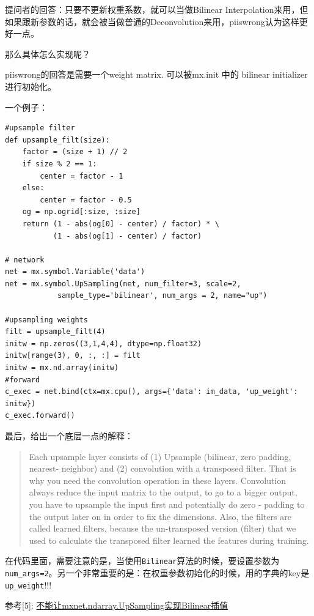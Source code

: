 提问者的回答：只要不更新权重系数，就可以当做Bilinear Interpolation来用，但如果跟新参数的话，就会被当做普通的Deconvolution来用，piiswrong认为这样更好一点。

那么具体怎么实现呢？

piiswrong的回答是需要一个weight matrix. 可以被mx.init 中的 bilinear initializer进行初始化。

一个例子：

\begin{lstlisting}
#upsample filter
def upsample_filt(size):
    factor = (size + 1) // 2
    if size % 2 == 1:
        center = factor - 1
    else:
        center = factor - 0.5
    og = np.ogrid[:size, :size]
    return (1 - abs(og[0] - center) / factor) * \
           (1 - abs(og[1] - center) / factor)

# network
net = mx.symbol.Variable('data')
net = mx.symbol.UpSampling(net, num_filter=3, scale=2, 
			sample_type='bilinear', num_args = 2, name="up")

#upsampling weights
filt = upsample_filt(4)
initw = np.zeros((3,1,4,4), dtype=np.float32)
initw[range(3), 0, :, :] = filt
initw = mx.nd.array(initw)
#forward
c_exec = net.bind(ctx=mx.cpu(), args={'data': im_data, 'up_weight': initw})
c_exec.forward()
\end{lstlisting}

最后，给出一个底层一点的解释：
\begin{quote}
Each upsample layer consists of (1) Upsample (bilinear, zero padding, nearest- neighbor) and (2) convolution with a transposed filter. That is why you need the convolution operation in these layers. Convolution always reduce the input matrix to the output, to go to a bigger output, you have to upsample the input first and potentially do zero - padding to the output later on in order to fix the dimensions. Also, the filters are called learned filters, because the un-transposed version (filter) that we used to calculate the transposed filter learned the features during training.
\end{quote}
在代码里面，需要注意的是，当使用\verb|Bilinear|算法的时候，要设置参数为\verb|num_args=2|。另一个非常重要的是：在权重参数初始化的时候，用的字典的key是\verb|up_weight|!!!

参考[5]: \href{https://github.com/apache/incubator-mxnet/issues/9138}{不能让mxnet.ndarray.UpSampling实现Bilinear插值}

